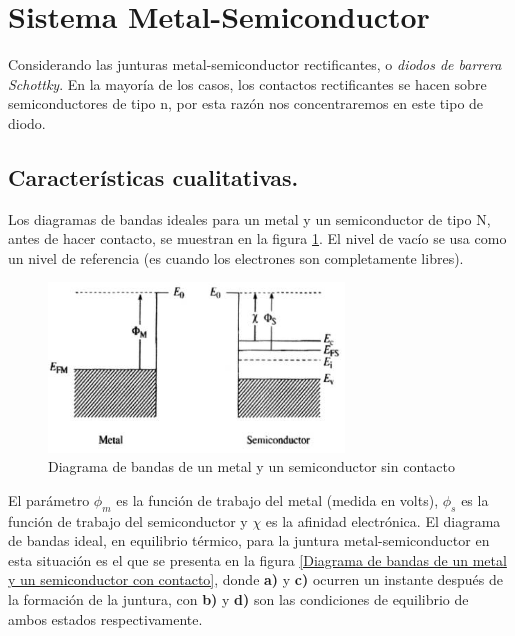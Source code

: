 \documentclass[oneside]{book}
\numberwithin{equation}{section}
\numberwithin{figure}{section}
\numberwithin{table}{section}
\begin{document}
		\section{Sistema Metal-Semiconductor}
		
			Considerando las junturas metal-semiconductor rectificantes, o \emph{diodos de barrera Schottky}. En la mayoría de los casos, los contactos rectificantes se hacen sobre semiconductores de tipo n, por esta razón nos concentraremos en este tipo de diodo.

			\subsection{Características cualitativas.}

				Los diagramas de bandas ideales para un metal y un semiconductor de tipo N, antes de hacer contacto, se muestran en la figura \ref{Diagrama de bandas de un metal y un semiconductor sin contacto}. El nivel de vacío se usa como un nivel de referencia (es cuando los electrones son completamente libres).

				\begin{figure}[H]
					\begin{center}
						\includegraphics[width=0.7\textwidth]{metalsemiconductorsincontacto.jpeg}
						\caption{Diagrama de bandas de un metal y un semiconductor sin contacto}
						\label{Diagrama de bandas de un metal y un semiconductor sin contacto}
					\end{center}
				\end{figure}

				El parámetro $\phi _{m}$ es la función de trabajo del metal (medida en volts), $\phi _{s}$ es la función de trabajo del semiconductor y $\chi$ es la afinidad electrónica. El diagrama de bandas ideal, en equilibrio térmico, para la juntura metal-semiconductor en esta situación es el que se presenta en la figura \ref{Diagrama de bandas de un metal y un semiconductor con contacto}, donde \textbf{a)} y \textbf{c)} ocurren un instante después de la formación de la juntura, con \textbf{b)} y \textbf{d)} son las condiciones de equilibrio de ambos estados respectivamente.
			
\end{document}
